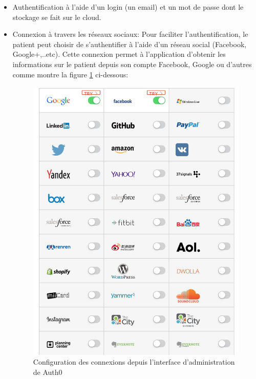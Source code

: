 \begin{itemize}
	\item Authentification à l’aide d’un login (un email) et un mot de passe dont le stockage se fait sur le cloud.
	\item Connexion à travers les réseaux sociaux: Pour faciliter l’authentification, le patient peut choisir de s'authentifier à l’aide d'un réseau social (Facebook, Google+,..etc). Cette connexion permet à l'application d’obtenir les informations sur le patient depuis son compte Facebook, Google ou d’autres comme montre la figure \ref{e5} ci-dessous:
	
	\newpage

\begin{figure}[!ht]
\begin{center}
\includegraphics[scale=0.3]{e5.jpg}
\caption{Configuration des connexions depuis l’interface d’administration de Auth0}
\label{e5}
\end{center}
\end{figure}
\end{itemize}

